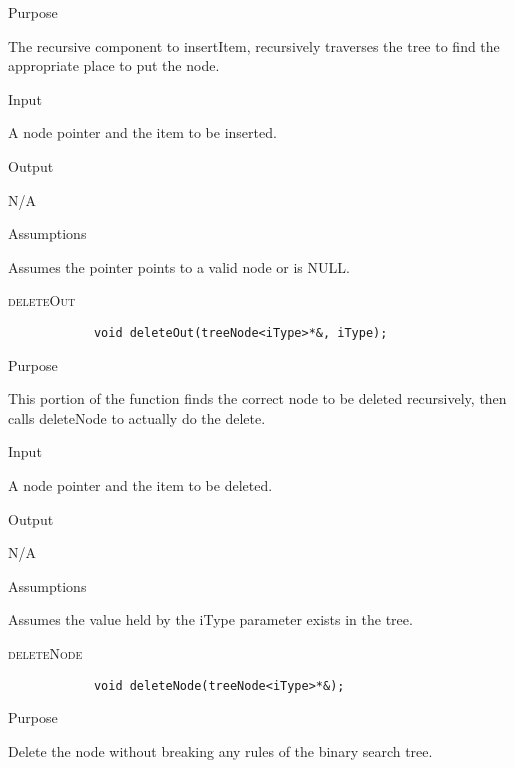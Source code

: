 \documentclass[pdftex, 12pt]{article}
\begin{document}
\begin{description}
\begin{description}
			\item{Purpose}

				The recursive component to insertItem, recursively traverses the tree to find the appropriate place to
				put the node.

			\item{Input}

				A node pointer and the item to be inserted.
				
			\item{Output}

				N/A

			\item{Assumptions}

				Assumes the pointer points to a valid node or is NULL.

		\end{description}
	\item{\textsc{deleteOut}}
		\begin{lstlisting}
			void deleteOut(treeNode<iType>*&, iType);
		\end{lstlisting}
		\begin{description}

			\item{Purpose}

				This portion of the function finds the correct node to be deleted recursively, then calls deleteNode to
				actually do the delete.

			\item{Input}

				A node pointer and the item to be deleted.

			\item{Output}

				N/A

			\item{Assumptions}

				Assumes the value held by the iType parameter exists in the tree.

		\end{description}
	\item{\textsc{deleteNode}}
		\begin{lstlisting}
			void deleteNode(treeNode<iType>*&);
		\end{lstlisting}
		\begin{description}

			\item{Purpose}

				Delete the node without breaking any rules of the binary search tree.


\end{description}
\end{description}
\end{document}

